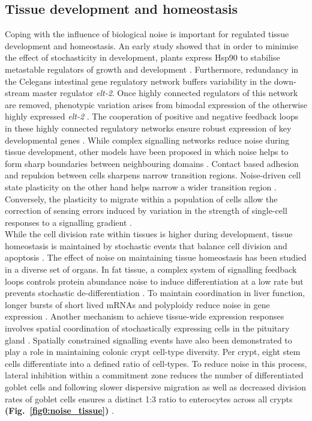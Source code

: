 \subsection{Tissue development and homeostasis}

Coping with the influence of biological noise is important for regulated tissue development and homeostasis. An early study showed that in order to minimise the effect of stochasticity in development, plants express \gls{Hsp90} to stabilise metastable regulators of growth and development \citep{Queitsch2002}. Furthermore, redundancy in the \Gls{Celegans} intestinal gene regulatory network buffers variability in the down-stream master regulator \textit{elt-2}. Once highly connected regulators of this network are removed, phenotypic variation arises from bimodal expression of the otherwise highly expressed \textit{elt-2} \citep{Raj2010}. The cooperation of positive and negative feedback loops in these highly connected regulatory networks ensure robust expression of key developmental genes \citep{Ji2013}. While complex signalling networks reduce noise during tissue development, other models have been proposed in which noise helps to form sharp boundaries between neighbouring domains \citep{Zhang2012}. Contact based adhesion and repulsion between cells sharpens narrow transition regions. Noise-driven cell state plasticity on the other hand helps narrow a wider transition region \citep{Wang2017}. Conversely, the plasticity to migrate within a population of cells allow the correction of sensing errors induced by variation in the strength of single-cell responses to a signalling gradient \citep{Camley2017}.\\

While the cell division rate within tissues is higher during development, tissue homeostasis is maintained by stochastic events that balance cell division and apoptosis \citep{Ranft2010}. The effect of noise on maintaining tissue homeostasis has been studied in a diverse set of organs. In fat tissue, a complex system of signalling feedback loops controls protein abundance noise to induce differentiation at a low rate but prevents stochastic de-differentiation \citep{Ahrends2014}. To maintain coordination in liver function, longer bursts of short lived mRNAs and polyploidy reduce noise in gene expression \citep{BaharHalpern2015}. Another mechanism to achieve tissue-wide expression responses involves spatial coordination of stochastically expressing cells in the pituitary gland \citep{Featherstone2016}. Spatially constrained signalling events have also been demonstrated to play a role in maintaining colonic crypt cell-type diversity. Per crypt, eight stem cells differentiate into a defined ratio of cell-types. To reduce noise in this process, lateral inhibition within a commitment zone reduces the number of differentiated goblet cells and following slower dispersive migration as well as decreased division rates of goblet cells ensures a distinct 1:3 ratio to enterocytes across all crypts \textbf{(Fig.~\ref{fig0:noise_tissue})} \citep{Toth2017}.\\

